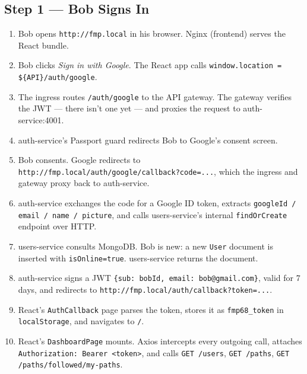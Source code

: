 \documentclass[11pt,a4paper]{article}
\begin{document}
\subsection{Step 1 — Bob Signs In}
\begin{enumerate}[leftmargin=*]
  \item Bob opens \texttt{http://fmp.local} in his browser.  Nginx
        (frontend) serves the React bundle.
  \item Bob clicks \emph{Sign in with Google}.  The React app calls
        \texttt{window.location = \$\{API\}/auth/google}.
  \item The ingress routes \texttt{/auth/google} to the API gateway.
        The gateway verifies the JWT — there isn't one yet — and
        proxies the request to auth-service:4001.
  \item auth-service's Passport guard redirects Bob to Google's
        consent screen.
  \item Bob consents.  Google redirects to
        \texttt{http://fmp.local/auth/google/callback?code=...},
        which the ingress and gateway proxy back to auth-service.
  \item auth-service exchanges the code for a Google ID token,
        extracts \texttt{googleId / email / name / picture}, and
        calls users-service's internal \texttt{findOrCreate}
        endpoint over HTTP.
  \item users-service consults MongoDB.  Bob is new: a new
        \texttt{User} document is inserted with
        \texttt{isOnline=true}.  users-service returns the
        document.
  \item auth-service signs a JWT \texttt{\{sub: bobId, email:
        bob@gmail.com\}}, valid for 7 days, and redirects to
        \texttt{http://fmp.local/auth/callback?token=...}.
  \item React's \texttt{AuthCallback} page parses the token,
        stores it as \texttt{fmp68\_token} in \texttt{localStorage},
        and navigates to \texttt{/}.
  \item React's \texttt{DashboardPage} mounts.  Axios intercepts
        every outgoing call, attaches \texttt{Authorization:
        Bearer <token>}, and calls
        \texttt{GET /users}, \texttt{GET /paths},
        \texttt{GET /paths/followed/my-paths}.
\end{enumerate}
\end{document}
